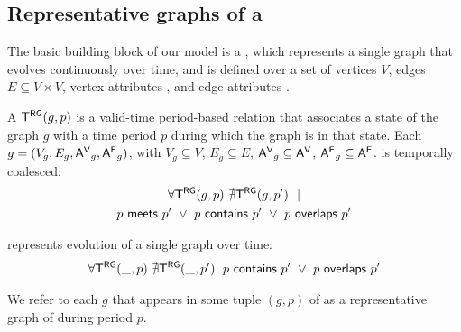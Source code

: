 

\subsection{Representative graphs of a \tg}
\label{sec:model:rg}

The basic building block of our model is a \tg, which represents a
single graph that evolves continuously over time, and is defined over
a set of vertices $V$, edges $E\subseteq V \times V$, vertex
attributes \avv, and edge attributes \aee.

\vspace{-0.2cm}
\begin{definition}[TGraph]
A \tg $\mathsf{T^{RG}}(g, p)$ is a valid-time period-based relation that
associates a state of the graph $g$ with a time period $p$ during
which the graph is in that state.
%
Each $g = (V_g, E_g, \mathsf{A^{V}}_g, \mathsf{A^{E}}_g)$, with $V_g \subseteq V$, $E_g
\subseteq E$, $\mathsf{A^{V}}_g \subseteq \mathsf{A^{V}}$, $\mathsf{A^{E}}_g \subseteq \mathsf{A^{E}}$.
%
\tgg is temporally coalesced:
\begin{multline}
\forall \mathsf{T^{RG}}(g,p)~\nexists \mathsf{T^{RG}}(g,p')~~| \\
        p~\mathsf{meets}~p'~\lor~p~\mathsf{contains}~p'~\lor~p~\mathsf{overlaps}~p'
\end{multline}

\tgg represents evolution of a single graph over time:
\begin{multline}
\forall \mathsf{T^{RG}}(\_,p)~\nexists \mathsf{T^{RG}}(\_,p')|~p~\mathsf{contains}~p'~\lor~p~\mathsf{overlaps}~p'
\end{multline}

We refer to each $g$ that appears in some tuple $(g,p)$ of \tgg as a
representative graph of \tgg during period $p$.
\label{def:tg_abstract}
\end{definition}

